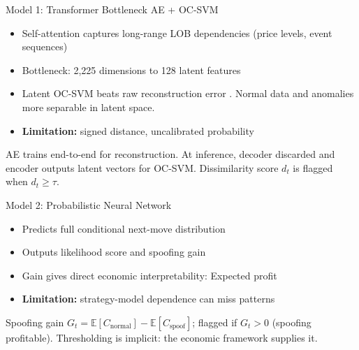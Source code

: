 \documentclass{beamer}
\begin{document}
\begin{frame}{Model 1: Transformer Bottleneck AE + OC-SVM \cite{poutre_2024}}
    \begin{tcolorbox}[keybox, title=Why this model]
        \begin{itemize}
            \item Self-attention captures long-range LOB dependencies (price levels, event sequences)
            \item Bottleneck: 2,225 dimensions to 128 latent features
            \item Latent OC-SVM beats raw reconstruction error \cite{poutre_2024}. Normal data and anomalies more separable in latent space.
            \item \textbf{Limitation:} signed distance, uncalibrated probability
        \end{itemize}
    \end{tcolorbox}
    \begin{tcolorbox}[keybox, title=Inference]
        AE trains end-to-end for reconstruction. At inference, decoder discarded and encoder outputs latent vectors for OC-SVM. Dissimilarity score $d_t$ is flagged when $d_t \geq \tau$.
    \end{tcolorbox}
\end{frame}

\begin{frame}{Model 2: Probabilistic Neural Network \cite{fabre_2025}}
    \begin{tcolorbox}[keybox, title=Why this model]
        \begin{itemize}
            \item Predicts full conditional next-move distribution
            \item Outputs likelihood score and spoofing gain
            \item Gain gives direct economic interpretability: Expected profit
            \item \textbf{Limitation:} strategy-model dependence can miss patterns
        \end{itemize}
    \end{tcolorbox}
    \begin{tcolorbox}[keybox, title=Anomaly Score]
        Spoofing gain $G_t = \mathbb{E}[C_{\text{normal}}] - \mathbb{E}[C_{\text{spoof}}]$; flagged if $G_t > 0$ (spoofing profitable). Thresholding is implicit: the economic framework supplies it.
    \end{tcolorbox}
\end{frame}
\end{document}
